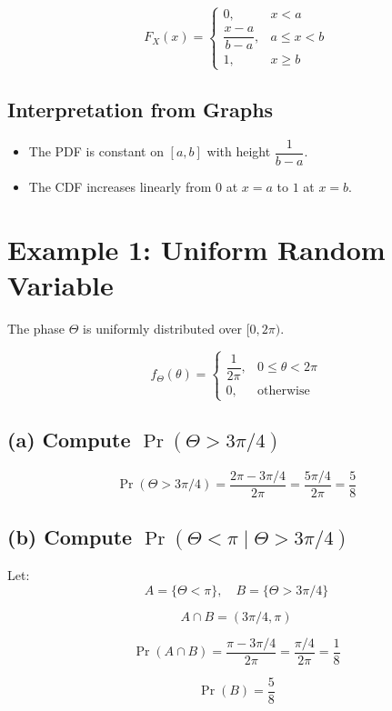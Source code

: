\documentclass[12pt]{article}
\begin{document}
\[
F_X(x) =
\begin{cases}
0, & x < a \\
\dfrac{x-a}{b-a}, & a \le x < b \\
1, & x \ge b
\end{cases}
\]

\subsection{Interpretation from Graphs}

\begin{itemize}
    \item The PDF is constant on $[a,b]$ with height $\dfrac{1}{b-a}$.
    \item The CDF increases linearly from $0$ at $x=a$ to $1$ at $x=b$.
\end{itemize}

\section{Example 1: Uniform Random Variable}

The phase $\Theta$ is uniformly distributed over $[0,2\pi)$.

\[
f_\Theta(\theta) =
\begin{cases}
\dfrac{1}{2\pi}, & 0 \le \theta < 2\pi \\
0, & \text{otherwise}
\end{cases}
\]

\subsection*{(a) Compute $\Pr(\Theta > 3\pi/4)$}

\[
\Pr(\Theta > 3\pi/4)
= \frac{2\pi - 3\pi/4}{2\pi}
= \frac{5\pi/4}{2\pi}
= \frac{5}{8}
\]

\subsection*{(b) Compute $\Pr(\Theta < \pi \mid \Theta > 3\pi/4)$}

Let:
\[
A = \{\Theta < \pi\}, \quad
B = \{\Theta > 3\pi/4\}
\]

\[
A \cap B = \left(3\pi/4, \pi\right)
\]

\[
\Pr(A \cap B)
= \frac{\pi - 3\pi/4}{2\pi}
= \frac{\pi/4}{2\pi}
= \frac{1}{8}
\]

\[
\Pr(B) = \frac{5}{8}
\]
\end{document}
